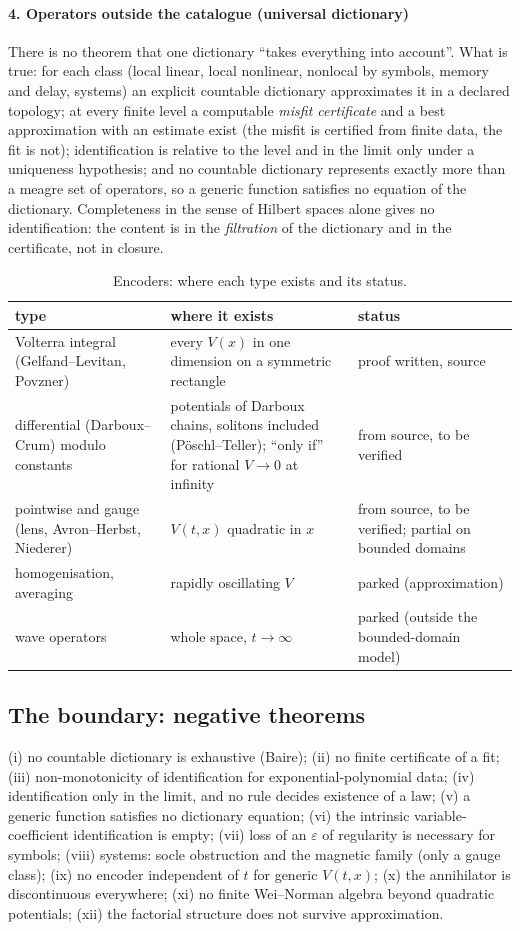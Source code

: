 \paragraph{4. Operators outside the catalogue (universal dictionary)} There is no theorem that one dictionary ``takes everything into account''. What is true: for each class (local linear, local nonlinear, nonlocal by symbols, memory and delay, systems) an explicit countable dictionary approximates it in a declared topology;
at every finite level a computable \emph{misfit certificate} and a best approximation with an estimate exist (the misfit is certified from finite data, the fit is not); identification is relative to the level and in the limit only under a uniqueness hypothesis; and no countable dictionary represents exactly more than a meagre set of operators, so a generic function satisfies no equation of the dictionary.
Completeness in the sense of Hilbert spaces alone gives no identification: the content is in the \emph{filtration} of the dictionary and in the certificate, not in closure.

\begin{table}[tbp]
\centering\small
\caption{Encoders: where each type exists and its status.}\label{tab:encoders}
\begin{tabular}{@{}p{4.4cm}p{5.3cm}p{2.3cm}@{}}
\toprule
type & where it exists & status\\
\midrule
Volterra integral (Gelfand--Levitan, Povzner) & every $V(x)$ in one dimension on a symmetric rectangle & proof written, source\\
differential (Darboux--Crum) modulo constants & potentials of Darboux chains, solitons included (P\"oschl--Teller); ``only if'' for rational $V\to0$ at infinity & from source, to be verified\\
pointwise and gauge (lens, Avron--Herbst, Niederer) & $V(t,x)$ quadratic in $x$ & from source, to be verified; partial on bounded domains\\
homogenisation, averaging & rapidly oscillating $V$ & parked (approximation)\\
wave operators & whole space, $t\to\infty$ & parked (outside the bounded-domain model)\\
\bottomrule
\end{tabular}
\end{table}

\subsection*{The boundary: negative theorems}
(i) no countable dictionary is exhaustive (Baire); (ii) no finite certificate of a fit; (iii) non-monotonicity of identification for exponential-polynomial data; (iv) identification only in the limit, and no rule decides existence of a law; (v) a generic function satisfies no dictionary equation; (vi) the intrinsic variable-coefficient identification is empty;
(vii) loss of an $\varepsilon$ of regularity is necessary for symbols; (viii) systems: socle obstruction and the magnetic family (only a gauge class); (ix) no encoder independent of $t$ for generic $V(t,x)$; (x) the annihilator is discontinuous everywhere; (xi) no finite Wei--Norman algebra beyond quadratic potentials; (xii) the factorial structure does not survive approximation.
